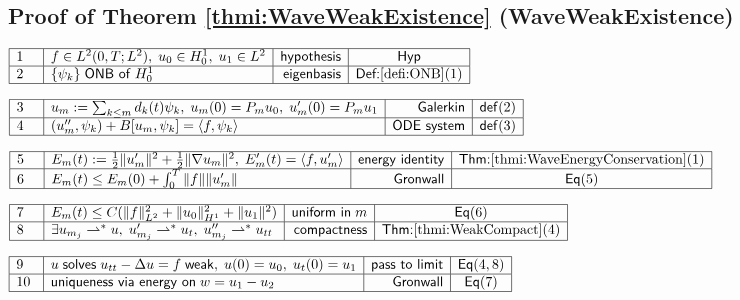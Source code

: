 \documentclass[11pt,reqno]{amsart}
\begin{document}
	\subsection*{Proof of Theorem \protect\ref{thmi:WaveWeakExistence} (\textsf{WaveWeakExistence})}
	\noindent$\begin{array}{|m{0.5cm}|l|r|c|}
	\hline
	1 & f\in L^{2}(0,T;L^{2}),\;u_{0}\in H_{0}^{1},\;u_{1}\in L^{2} & \mathsf{hypothesis} & \mathsf{Hyp} \\ \hline
	2 & \{\psi_{k}\}\;\mathsf{ONB\ of}\;H_{0}^{1} & \mathsf{eigenbasis} & \textsf{Def:}\ref{defi:ONB}(1) \\ \hline
	\end{array}$
	\par\nointerlineskip\noindent$\begin{array}{|m{0.5cm}|l|r|c|}
	\hline
	3 & u_{m}:=\sum_{k\le m}d_{k}(t)\psi_{k},\;u_{m}(0)=P_{m}u_{0},\;u_{m}^{\prime}(0)=P_{m}u_{1} & \mathsf{Galerkin} & \mathsf{def}(2) \\ \hline
	4 & (u_{m}^{\prime\prime},\psi_{k})+B[u_{m},\psi_{k}]=\langle f,\psi_{k}\rangle & \mathsf{ODE\ system} & \mathsf{def}(3) \\ \hline
	\end{array}$
	\par\nointerlineskip\noindent$\begin{array}{|m{0.5cm}|l|r|c|}
	\hline
	5 & E_{m}(t):=\tfrac12\|u_{m}^{\prime}\|^{2}+\tfrac12\|\nabla u_{m}\|^{2},\;E_{m}^{\prime}(t)=\langle f,u_{m}^{\prime}\rangle & \mathsf{energy\ identity} & \textsf{Thm:}\ref{thmi:WaveEnergyConservation}(1) \\ \hline
	6 & E_{m}(t)\le E_{m}(0)+\int_{0}^{T}\|f\|\|u_{m}^{\prime}\| & \mathsf{Gronwall} & \mathsf{Eq}(5) \\ \hline
	\end{array}$
	\par\nointerlineskip\noindent$\begin{array}{|m{0.5cm}|l|r|c|}
	\hline
	7 & E_{m}(t)\le C(\|f\|_{L^{2}}^{2}+\|u_{0}\|_{H^{1}}^{2}+\|u_{1}\|^{2}) & \mathsf{uniform\ in}\;m & \mathsf{Eq}(6) \\ \hline
	8 & \exists u_{m_{j}}\rightharpoonup^{*}u,\;u_{m_{j}}^{\prime}\rightharpoonup^{*}u_{t},\;u_{m_{j}}^{\prime\prime}\rightharpoonup^{*}u_{tt} & \mathsf{compactness} & \textsf{Thm:}\ref{thmi:WeakCompact}(4) \\ \hline
	\end{array}$
	\par\nointerlineskip\noindent$\begin{array}{|m{0.5cm}|l|r|c|}
	\hline
	9 & u\;\mathsf{solves}\;u_{tt}-\Delta u=f\;\mathsf{weak},\;u(0)=u_{0},\;u_{t}(0)=u_{1} & \mathsf{pass\ to\ limit} & \mathsf{Eq}(4,8) \\ \hline
	10 & \mathsf{uniqueness\ via\ energy\ on}\;w=u_{1}-u_{2} & \mathsf{Gronwall} & \mathsf{Eq}(7) \\ \hline
	\end{array}$
\end{document}
